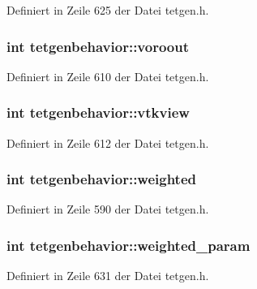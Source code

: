 Definiert in Zeile 625 der Datei tetgen.\-h.

\hypertarget{classtetgenbehavior_a803f05aaa63121d3228b96573c5b2488}{
\subsubsection[{voroout}]{\setlength{\rightskip}{0pt plus 5cm}int tetgenbehavior\-::voroout}}\label{classtetgenbehavior_a803f05aaa63121d3228b96573c5b2488}


Definiert in Zeile 610 der Datei tetgen.\-h.

\hypertarget{classtetgenbehavior_a8d7ada13e9df46a4ccb860de0d5bd978}{
\subsubsection[{vtkview}]{\setlength{\rightskip}{0pt plus 5cm}int tetgenbehavior\-::vtkview}}\label{classtetgenbehavior_a8d7ada13e9df46a4ccb860de0d5bd978}


Definiert in Zeile 612 der Datei tetgen.\-h.

\hypertarget{classtetgenbehavior_a6ad479e03a42fab8c5f6e4d6adb1be47}{
\subsubsection[{weighted}]{\setlength{\rightskip}{0pt plus 5cm}int tetgenbehavior\-::weighted}}\label{classtetgenbehavior_a6ad479e03a42fab8c5f6e4d6adb1be47}


Definiert in Zeile 590 der Datei tetgen.\-h.

\hypertarget{classtetgenbehavior_af7f32fedb214eab9b328974e2b564437}{
\subsubsection[{weighted\-\_\-param}]{\setlength{\rightskip}{0pt plus 5cm}int tetgenbehavior\-::weighted\-\_\-param}}\label{classtetgenbehavior_af7f32fedb214eab9b328974e2b564437}


Definiert in Zeile 631 der Datei tetgen.\-h.

